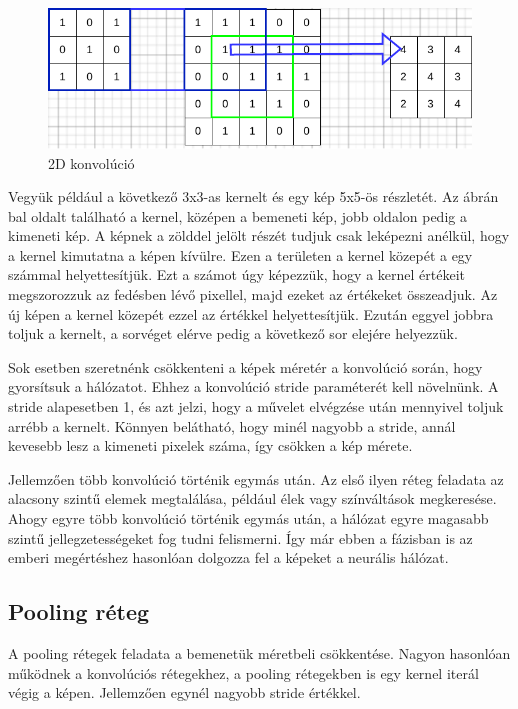 \begin{figure}[!ht]
    \centering
    \includegraphics[width=150mm, keepaspectratio]{drawings/conv.drawio.pdf}
    \caption{2D konvolúció}
\end{figure}

Vegyük például a következő 3x3-as kernelt és egy kép 5x5-ös részletét. Az ábrán bal oldalt található a kernel, középen a bemeneti kép, jobb oldalon pedig a kimeneti kép. A képnek a zölddel jelölt részét tudjuk csak leképezni anélkül, hogy a kernel kimutatna a képen kívülre. Ezen a területen a kernel közepét a egy számmal helyettesítjük. Ezt a számot úgy képezzük, hogy a kernel értékeit megszorozzuk az fedésben lévő pixellel, majd ezeket az értékeket összeadjuk. Az új képen a kernel közepét ezzel az értékkel helyettesítjük. Ezután eggyel jobbra toljuk a kernelt, a sorvéget elérve pedig a következő sor elejére helyezzük.

Sok esetben szeretnénk csökkenteni a képek méretér a konvolúció során, hogy gyorsítsuk a hálózatot. Ehhez a konvolúció stride paraméterét kell növelnünk. A stride alapesetben 1, és azt jelzi, hogy a művelet elvégzése után mennyivel toljuk arrébb a kernelt. Könnyen belátható, hogy minél nagyobb a stride, annál kevesebb lesz a kimeneti pixelek száma, így csökken a kép mérete.

Jellemzően több konvolúció történik egymás után. Az első ilyen réteg feladata az alacsony szintű elemek megtalálása, például élek vagy színváltások megkeresése. Ahogy egyre több konvolúció történik egymás után, a hálózat egyre magasabb szintű jellegzetességeket fog tudni felismerni. Így már ebben a fázisban is az emberi megértéshez hasonlóan dolgozza fel a képeket a neurális hálózat.
\cite{ConvNetExplain}

\subsection{Pooling réteg}
A pooling rétegek feladata a bemenetük méretbeli csökkentése. Nagyon hasonlóan működnek a konvolúciós rétegekhez, a pooling rétegekben is egy kernel iterál végig a képen. Jellemzően egynél nagyobb stride értékkel.

